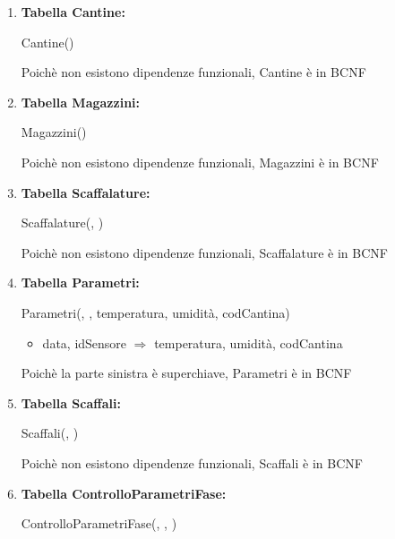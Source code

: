\documentclass[12pt,a4paper]{article}
\begin{document}
\begin{enumerate}
\item[] \textbf{Tabella Cantine:}

Cantine(\underline{})

Poichè non esistono dipendenze funzionali, Cantine è in BCNF
\vspace{10pt}



\item[] \textbf{Tabella Magazzini:}

Magazzini(\underline{})

Poichè non esistono dipendenze funzionali, Magazzini è in BCNF
\vspace{10pt}



\item[] \textbf{Tabella Scaffalature:}

Scaffalature(\underline{}, \underline{})

Poichè non esistono dipendenze funzionali, Scaffalature è in BCNF
\vspace{10pt}



\item[] \textbf{Tabella Parametri:}

Parametri(\underline{}, \underline{}, temperatura, umidità,  codCantina)
\begin{itemize}
\vspace{-5pt}
\item data, idSensore $\Rightarrow$ temperatura, umidità, codCantina
\vspace{-5pt}
\end{itemize}
Poichè la parte sinistra è superchiave, Parametri è in BCNF
\vspace{10pt}



\item[] \textbf{Tabella Scaffali:}

Scaffali(\underline{}, \underline{})

Poichè non esistono dipendenze funzionali, Scaffali è in BCNF
\vspace{10pt}



\item[] \textbf{Tabella ControlloParametriFase:}

ControlloParametriFase(\underline{}, \underline{}, \underline{})


\end{enumerate}
\end{document}
